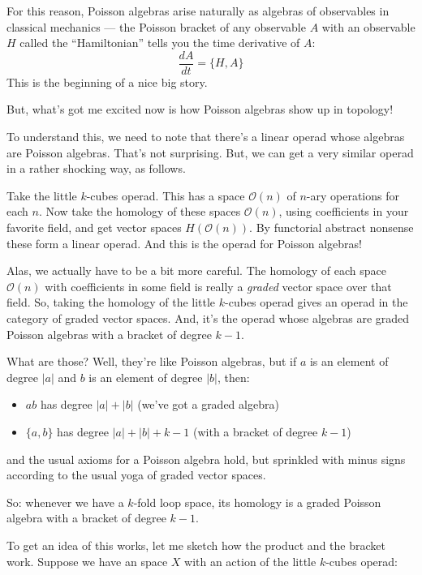\documentclass{article}
\def\tightlist{}
\begin{document}
For this reason, Poisson algebras arise naturally as algebras of
observables in classical mechanics --- the Poisson bracket of any
observable \(A\) with an observable \(H\) called the ``Hamiltonian''
tells you the time derivative of \(A\): \[\frac{dA}{dt} = \{H,A\}\] This
is the beginning of a nice big story.

But, what's got me excited now is how Poisson algebras show up in
topology!

To understand this, we need to note that there's a linear operad whose
algebras are Poisson algebras. That's not surprising. But, we can get a
very similar operad in a rather shocking way, as follows.

Take the little \(k\)-cubes operad. This has a space \(\mathcal{O}(n)\)
of \(n\)-ary operations for each \(n\). Now take the homology of these
spaces \(\mathcal{O}(n)\), using coefficients in your favorite field,
and get vector spaces \(H(\mathcal{O}(n))\). By functorial abstract
nonsense these form a linear operad. And this is the operad for Poisson
algebras!

Alas, we actually have to be a bit more careful. The homology of each
space \(\mathcal{O}(n)\) with coefficients in some field is really a
\emph{graded} vector space over that field. So, taking the homology of
the little \(k\)-cubes operad gives an operad in the category of graded
vector spaces. And, it's the operad whose algebras are graded Poisson
algebras with a bracket of degree \(k-1\).

What are those? Well, they're like Poisson algebras, but if \(a\) is an
element of degree \(|a|\) and \(b\) is an element of degree \(|b|\),
then:

\begin{itemize}
\tightlist
\item
  \(ab\) has degree \(|a| + |b|\) (we've got a graded algebra)
\item
  \(\{a,b\}\) has degree \(|a| + |b| + k - 1\) (with a bracket of degree
  \(k-1\))
\end{itemize}

and the usual axioms for a Poisson algebra hold, but sprinkled with
minus signs according to the usual yoga of graded vector spaces.

So: whenever we have a \(k\)-fold loop space, its homology is a graded
Poisson algebra with a bracket of degree \(k-1\).

To get an idea of this works, let me sketch how the product and the
bracket work. Suppose we have an space \(X\) with an action of the
little \(k\)-cubes operad:
\end{document}
